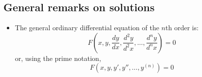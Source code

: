\documentclass[../jaynes_prob_theory_notes.tex]{subfiles}
\begin{document}
    \subsection{General remarks on solutions}
        \begin{itemize}
            \item The general ordinary differential equation of the $n$th order is:
                \begin{equation*}
                    F \left( x,y, \frac{dy}{dx}, \frac{d^{2}y}{d^{2}x}, \ldots, \frac{d^{n}y}{d^{n}x} \right) = 0
                \end{equation*}
                or, using the prime notation,
                \begin{equation*}
                    F \left( x,y,y',y'', \ldots, y^{(n)} \right) = 0
                \end{equation*}
                

\end{itemize}
\end{document}
